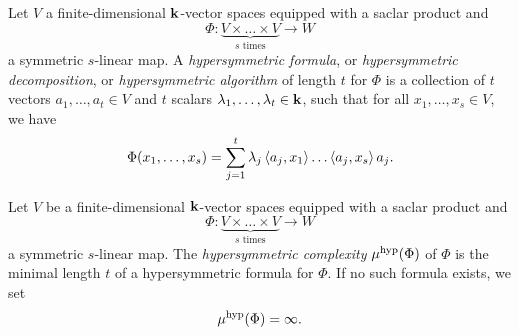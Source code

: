 \begin{defi}
Let $V$ a finite-dimensional $\mathbf{k}$-vector
spaces equipped with a saclar product and
\[
  \Phi:\underset{\textrm{$s$ times}}{\underbrace{V\times\dots\times V}}\to W
\]
a symmetric $s$-linear map. A \emph{hypersymmetric formula}, or
\emph{hypersymmetric decomposition}, or \emph{hypersymmetric algorithm} of length $t$ for $\Phi$ is a
collection of $t$ vectors $a_1, \dots, a_t\in V$ and $t$ scalars $\lambda_1,
\dots, \lambda_t\in\mathbf{k}$, such that for all $x_1, \dots, x_s\in
V$, we have
\[
  \Phi(x_1, \dots, x_s) =
  \sum_{j=1}^t\lambda_j\left\langle a_j,x_1\right\rangle\dots\left\langle a_j,x_s\right\rangle a_j.
\]
\end{defi}
\begin{defi}
Let $V$ be a finite-dimensional $\mathbf{k}$-vector spaces equipped with a saclar product
and
\[
  \Phi:\underset{\textrm{$s$ times}}{\underbrace{V\times\dots\times V}}\to W
\]
a symmetric $s$-linear map. The \emph{hypersymmetric complexity} $\mu^{\textrm{hyp}}(\Phi)$ of $\Phi$ is the
minimal length $t$ of a hypersymmetric formula for $\Phi$. If no such
formula exists, we set
\[
  \mu^{\textrm{hyp}}(\Phi) = \infty.
\]
\end{defi}
